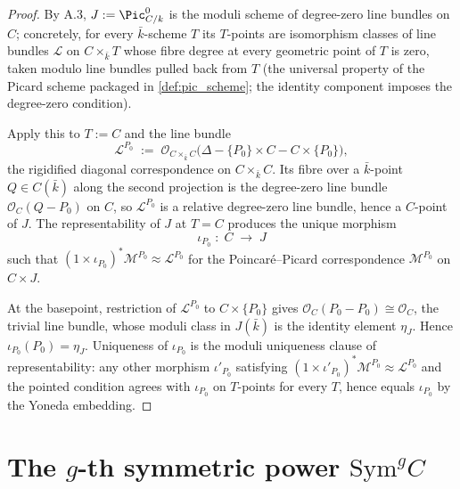\begin{proof}
  
  By A.3, \(J := \Pic^0_{C/k}\) is the moduli scheme of degree-zero line bundles
  on \(C\); concretely, for every \(\bar k\)-scheme \(T\) its \(T\)-points are
  isomorphism classes of line bundles \(\mathcal L\) on \(C \times_{\bar k} T\)
  whose fibre degree at every geometric point of \(T\) is zero, taken modulo line
  bundles pulled back from \(T\) (the universal property of the Picard scheme
  packaged in \cref{def:pic_scheme}; the identity component imposes the
  degree-zero condition).

  Apply this to \(T := C\) and the line bundle
  \[
    \mathcal L^{P_0} \;:=\; \mathcal O_{C \times_{\bar k} C}\bigl(\Delta -
      \{P_0\} \times C - C \times \{P_0\}\bigr),
  \]
  the rigidified diagonal correspondence on \(C \times_{\bar k} C\). Its fibre
  over a \(\bar k\)-point \(Q \in C(\bar k)\) along the second projection is the
  degree-zero line bundle \(\mathcal O_C(Q - P_0)\) on \(C\), so \(\mathcal L^{P_0}\)
  is a relative degree-zero line bundle, hence a \(C\)-point of \(J\). The
  representability of \(J\) at \(T = C\) produces the unique morphism
  \[
    \iota_{P_0} \;\colon\; C \;\longrightarrow\; J
  \]
  such that \((1 \times \iota_{P_0})^*\mathcal M^{P_0} \approx \mathcal L^{P_0}\)
  for the Poincar\'e--Picard correspondence \(\mathcal M^{P_0}\) on \(C \times J\).

  At the basepoint, restriction of \(\mathcal L^{P_0}\) to \(C \times \{P_0\}\)
  gives \(\mathcal O_C(P_0 - P_0) \cong \mathcal O_C\), the trivial line bundle,
  whose moduli class in \(J(\bar k)\) is the identity element \(\eta_J\). Hence
  \(\iota_{P_0}(P_0) = \eta_J\). Uniqueness of \(\iota_{P_0}\) is the moduli
  uniqueness clause of representability: any other morphism \(\iota'_{P_0}\)
  satisfying \((1 \times \iota'_{P_0})^*\mathcal M^{P_0} \approx \mathcal L^{P_0}\)
  and the pointed condition agrees with \(\iota_{P_0}\) on \(T\)-points for every
  \(T\), hence equals \(\iota_{P_0}\) by the Yoneda embedding.
\end{proof}

\section{The \(g\)-th symmetric power \(\mathrm{Sym}^g C\)}
\label{sec:albaneseup_sym_g}

